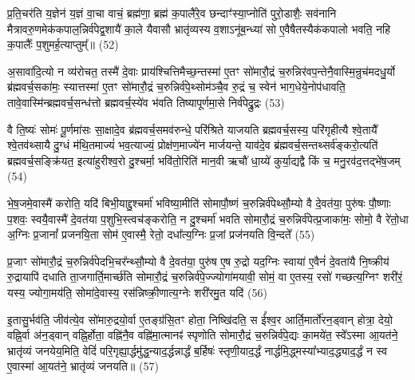 प्र॒ति॒चर॑ति य॒ज्ञेन॑ य॒ज्ञं वा॒चा वाचं॒ ब्रह्म॑णा॒ ब्रह्म॑ क॒पालै॑रे॒व छन्दाꣳ॑स्या॒प्नोति॑ पुरो॒डाशैः॒ सव॑नानि मैत्रावरु॒णमेक॑कपाल॒न्निर्व॑पेद्व॒शायै॑ का॒ले यैवासौ भ्रातृ॑व्यस्य व॒शा\-ऽनू॑ब॒न्ध्या॑ सो ए॒वैषैतस्यैक॑कपालो भवति॒ नहि क॒पालैः᳚ प॒शुमर्\mbox{}ह॒त्याप्तुम्᳚॥ (52)

{\anuvakamend[{ब्रह्म॑णै॒वैन॑म॒भिच॑रति य॒ज्ञो न तावे॒वास्ये᳚न्द्रि॒यमा᳚प्नोति दे॒वताः᳚ स॒प्तत्रिꣳ॑शच्च।9।}]}

अ॒सावा॑दि॒त्यो न व्य॑रोचत॒ तस्मै॑ दे॒वाः प्राय॑श्चित्तिमैच्छ॒न्तस्मा॑ ए॒तꣳ सो॑मारौ॒द्रं च॒रुन्निर॑वप॒न्तेनै॒वास्मि॒न्रुच॑मदधु॒र्यो ब्र॑ह्मवर्च॒सका॑मः॒ स्यात्तस्मा॑ ए॒तꣳ सो॑मारौ॒द्रं च॒रुन्निर्व॑पे॒थ्सोम॑ञ्चै॒व रु॒द्रं च॒ स्वेन॑ भाग॒धेये॒नोप॑धावति॒ तावे॒वास्मि॑न्ब्रह्मवर्च॒सन्ध॑त्तो ब्रह्मवर्च॒स्ये॑व भ॑वति तिष्यापूर्णमा॒से निर्व॑पेद्रु॒द्रः (53)

वै ति॒ष्यः॑ सोमः॑ पू॒र्णमा॑सः सा॒क्षादे॒व ब्र॑ह्मवर्च॒समव॑रुन्धे॒ परि॑श्रिते याजयति ब्रह्मवर्च॒सस्य॒ परि॑गृहीत्यै श्वे॒तायै᳚ श्वे॒तव॑थ्सायै दु॒ग्धं म॑थि॒तमाज्यं॑ भव॒त्याज्यं॒ प्रोक्ष॑ण॒माज्ये॑न मार्जयन्ते॒ याव॑दे॒व ब्र॑ह्मवर्च॒सन्तथ्सर्व॑ङ्करो॒त्यति॑ ब्रह्मवर्च॒सङ्क्रि॑यत॒ इत्या॑हुरीश्व॒रो दु॒श्चर्मा॒ भवि॑तो॒रिति॑ मान॒वी ऋचौ॑ धा॒य्ये॑ कुर्या॒द्यद्वै किं च॒ मनु॒रव॑द॒त्तद्भे॑ष॒जम् (54)

भे॒ष॒जमे॒वास्मै॑ करोति॒ यदि॑ बिभी॒याद्दु॒श्चर्मा॑ भविष्या॒मीति॑ सोमापौ॒ष्णं च॒रुन्निर्व॑पेथ्सौ॒म्यो वै दे॒वत॑या॒ पुरु॑षः पौ॒ष्णाः प॒शवः॒ स्वयै॒वास्मै॑ दे॒वत॑या प॒शुभि॒स्त्वच॑ङ्करोति॒ न दु॒श्चर्मा॑ भवति सोमारौ॒द्रं च॒रुन्निर्व॑पेत्प्र॒जाका॑मः॒ सोमो॒ वै रे॑तो॒धा अ॒ग्निः प्र॒जानां᳚ प्रजनयि॒ता सोम॑ ए॒वास्मै॒ रेतो॒ दधा᳚त्य॒ग्निः प्र॒जां प्रज॑नयति वि॒न्दते᳚ (55)

प्र॒जाꣳ सो॑मारौ॒द्रं च॒रुन्निर्व॑पेदभि॒चर᳚न्थ्सौ॒म्यो वै दे॒वत॑या॒ पुरु॑ष ए॒ष रु॒द्रो यद॒ग्निः स्वाया॑ ए॒वैनं॑ दे॒वता॑यै नि॒ष्क्रीय॑ रु॒द्रायापि॑ दधाति ता॒जगार्ति॒मार्च्छ॑ति सोमारौ॒द्रं च॒रुन्निर्व॑पे॒ज्ज्योगा॑मयावी॒ सोमं॒ वा ए॒तस्य॒ रसो॑ गच्छत्य॒ग्निꣳ शरी॑रं॒ यस्य॒ ज्योगा॒मय॑ति॒ सोमा॑दे॒वास्य॒ रस॑न्निष्क्री॒णात्य॒ग्नेः शरी॑रमु॒त यदि॑ (56)

इ॒तासु॒र्भव॑ति॒ जीव॑त्ये॒व सो॑मारु॒द्रयो॒र्वा ए॒तङ्ग्र॑सि॒तꣳ होता॒ निष्खि॑दति॒ स ई᳚श्व॒र आर्ति॒मार्तो॑रन॒ड्वान् होत्रा॒ देयो॒ वह्नि॒र्वा अ॑न॒ड्वान् वह्नि॒र्\mbox{}होता॒ वह्नि॑नै॒व वह्नि॑मा॒त्मानꣴ॑ स्पृणोति सोमारौ॒द्रं च॒रुन्निर्व॑पे॒द्यः का॒मये॑त॒ स्वे᳚\-ऽस्मा आ॒यत॑ने॒ भ्रातृ॑व्यं जनयेय॒मिति॒ वेदिं॑ परि॒गृह्या॒र्द्धमु॑द्ध॒न्याद॒र्द्धन्नार्द्धं ब॒र्\mbox{}हिषः॑ स्तृणी॒याद॒र्द्धं नार्द्धमि॒द्ध्मस्या᳚भ्याद॒द्ध्याद॒र्द्धं न स्व ए॒वास्मा॑ आ॒यत॑ने॒ भ्रातृ॑व्यं जनयति॥ (57)

